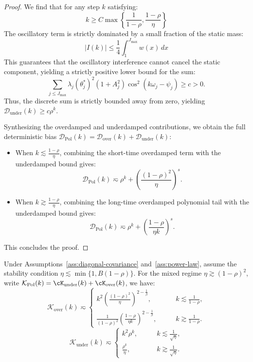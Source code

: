 \begin{proof}
We find that for any step $k$ satisfying:
\[
    k \ge C\max\left\{\frac{1}{1-\rho}, \frac{1-\rho}{\eta}\right\}
\]
The oscillatory term is strictly dominated by a small fraction of the static mass:
\[
    |I(k)| \le \frac{1}{4} \int_{1}^{J_{\max}} w(x) \, dx
\]
This guarantees that the oscillatory interference cannot cancel the static component, yielding a strictly positive lower bound for the sum:
\begin{equation*}
    \sum_{j \le J_{\max}} \lambda_j (\theta_j^*)^2 (1+A_j^2) \cos^2(k\omega_j - \psi_j) \ge c > 0.
\end{equation*}
Thus, the discrete sum is strictly bounded away from zero, yielding $\mathcal{D}_{\mathrm{under}}(k) \ge c \rho^k$.

Synthesizing the overdamped and underdamped contributions, we obtain the full deterministic bias $\mathcal{D}_{\mathrm{Pol}}(k) = \mathcal{D}_{\mathrm{over}}(k) + \mathcal{D}_{\mathrm{under}}(k)$:
\begin{itemize}
    \item When $k \lesssim \frac{1-\rho}{\eta}$, combining the short-time overdamped term with the underdamped bound gives:
    \[
        \mathcal{D}_{\mathrm{Pol}}(k) \eqsim \rho^k + \left(\frac{(1-\rho)^2}{\eta}\right)^s.
    \]
    \item When $k \gtrsim \frac{1-\rho}{\eta}$, combining the long-time overdamped polynomial tail with the underdamped bound gives:
    \[
        \mathcal{D}_{\mathrm{Pol}}(k) \eqsim \rho^k + \left(\frac{1-\rho}{\eta k}\right)^s.
    \]
\end{itemize}
This concludes the proof.
\end{proof}


\begin{lemma}
\label{lem:pol_kernel}
Under Assumptions~\ref{ass:diagonal-covariance} and~\ref{ass:power-law}, assume the stability condition
$\eta\lesssim \min\{1,B(1-\rho)\}$. For the mixed regime \(\eta\gtrsim(1-\rho)^2\), write \(\mathcal{K}_{\mathrm{Pol}}(k)=\cK_{\mathrm{under}}(k)+\cK_{\mathrm{over}}(k)\), we have:
\begin{equation*}
    \mathcal{K}_{\mathrm{over}}(k)
    \eqsim
    \begin{cases}
    k^2 \left(\frac{(1-\rho)^2}{\eta}\right)^{2-\frac1\beta},&\qquad k\lesssim \frac{1}{1-\rho},\\
    \frac{1}{(1-\rho)^2}\left(\frac{1-\rho}{\eta k}\right)^{2-\frac1\beta},&\qquad k\gtrsim\frac{1}{1-\rho}.
    \end{cases}
\end{equation*}
\begin{equation*}
    \mathcal{K}_{\mathrm{under}}(k)
    \eqsim
\begin{cases}
    k^2\rho^k,&\qquad k\lesssim\frac{1}{\sqrt{\eta}},\\
    \frac{\rho^k}{\eta},&\qquad k\gtrsim\frac{1}{\sqrt{\eta}}.
    \end{cases}
\end{equation*}
\end{lemma}

